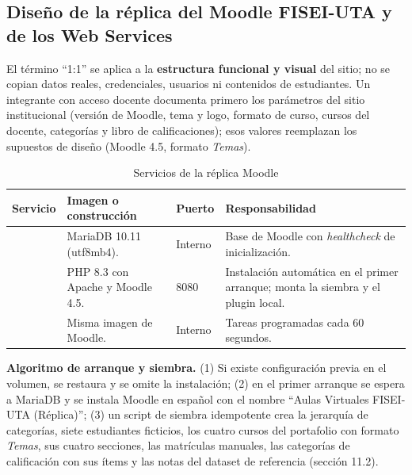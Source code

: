 \documentclass[11pt,a4paper]{article}
\newcommand{\hd}[1]{\textbf{#1}}
\begin{document}
\subsection{Diseño de la réplica del Moodle FISEI-UTA y de los Web Services}
El término ``1:1'' se aplica a la \textbf{estructura funcional y visual} del sitio; no se copian datos reales, credenciales, usuarios ni contenidos de estudiantes. Un integrante con acceso docente documenta primero los parámetros del sitio institucional (versión de Moodle, tema y logo, formato de curso, cursos del docente, categorías y libro de calificaciones); esos valores reemplazan los supuestos de diseño (Moodle 4.5, formato \emph{Temas}).

\begin{table}[H]
\centering\small
\caption{Servicios de la réplica Moodle}
\begin{tabularx}{\textwidth}{|R{2.9cm}|R{4.2cm}|R{1.4cm}|Y|}
\hline
\hd{Servicio} & \hd{Imagen o construcción} & \hd{Puerto} & \hd{Responsabilidad}\\ \hline
{} & MariaDB 10.11 (utf8mb4). & Interno & Base de Moodle con \emph{healthcheck} de inicialización.\\ \hline
{} & PHP 8.3 con Apache y Moodle 4.5. & 8080 & Instalación automática en el primer arranque; monta la siembra y el plugin local.\\ \hline
{} & Misma imagen de Moodle. & Interno & Tareas programadas cada 60 segundos.\\ \hline
\end{tabularx}
\end{table}

\textbf{Algoritmo de arranque y siembra.} (1) Si existe configuración previa en el volumen, se restaura y se omite la instalación; (2) en el primer arranque se espera a MariaDB y se instala Moodle en español con el nombre ``Aulas Virtuales FISEI-UTA (Réplica)''; (3) un script de siembra idempotente crea la jerarquía de categorías, siete estudiantes ficticios, los cuatro cursos del portafolio con formato \emph{Temas}, sus cuatro secciones, las matrículas manuales, las categorías de calificación con sus ítems y las notas del dataset de referencia (sección 11.2).

\begin{center}
\end{center}
\end{document}
